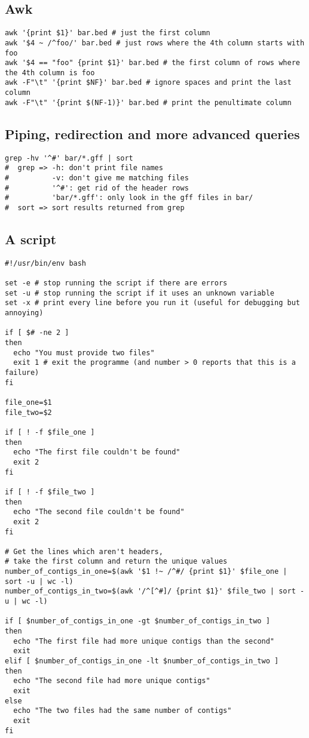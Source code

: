 \documentclass[11pt]{article}
\begin{document}
\hypertarget{awk}{%
\subsection{Awk}\label{awk}}

\begin{verbatim}
awk '{print $1}' bar.bed # just the first column
awk '$4 ~ /^foo/' bar.bed # just rows where the 4th column starts with foo
awk '$4 == "foo" {print $1}' bar.bed # the first column of rows where the 4th column is foo
awk -F"\t" '{print $NF}' bar.bed # ignore spaces and print the last column
awk -F"\t" '{print $(NF-1)}' bar.bed # print the penultimate column
\end{verbatim}

\hypertarget{piping-redirection-and-more-advanced-queries}{%
\subsection{Piping, redirection and more advanced
queries}\label{piping-redirection-and-more-advanced-queries}}

\begin{verbatim}
grep -hv '^#' bar/*.gff | sort
#  grep => -h: don't print file names
#          -v: don't give me matching files
#          '^#': get rid of the header rows
#          'bar/*.gff': only look in the gff files in bar/
#  sort => sort results returned from grep
\end{verbatim}

\hypertarget{a-script}{%
\subsection{A script}\label{a-script}}

\begin{verbatim}
#!/usr/bin/env bash

set -e # stop running the script if there are errors
set -u # stop running the script if it uses an unknown variable
set -x # print every line before you run it (useful for debugging but annoying)

if [ $# -ne 2 ]
then
  echo "You must provide two files"
  exit 1 # exit the programme (and number > 0 reports that this is a failure)
fi

file_one=$1
file_two=$2

if [ ! -f $file_one ]
then
  echo "The first file couldn't be found"
  exit 2
fi

if [ ! -f $file_two ]
then
  echo "The second file couldn't be found"
  exit 2
fi

# Get the lines which aren't headers,
# take the first column and return the unique values
number_of_contigs_in_one=$(awk '$1 !~ /^#/ {print $1}' $file_one | sort -u | wc -l)
number_of_contigs_in_two=$(awk '/^[^#]/ {print $1}' $file_two | sort -u | wc -l)

if [ $number_of_contigs_in_one -gt $number_of_contigs_in_two ]
then
  echo "The first file had more unique contigs than the second"
  exit
elif [ $number_of_contigs_in_one -lt $number_of_contigs_in_two ]
then
  echo "The second file had more unique contigs"
  exit
else
  echo "The two files had the same number of contigs"
  exit
fi
\end{verbatim}
\end{document}
